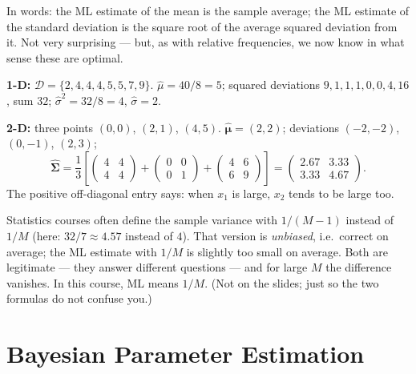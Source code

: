 \documentclass[11pt, oneside]{book}
\newcommand{\dataset}{\mathcal{D}}       %
\let\originalsection\section
\renewcommand{\section}{\Needspace{7\baselineskip}\originalsection}
\begin{document}
In words: the ML estimate of the mean is the sample average; the ML estimate
of the standard deviation is the square root of the average squared deviation
from it. Not very surprising --- but, as with relative frequencies, we now know
in what sense these are optimal.

\begin{exbox}[title={Two small Gaussian fits}]
\textbf{1-D:} $\dataset = \{2, 4, 4, 4, 5, 5, 7, 9\}$.
$\hat\mu = 40/8 = 5$; squared deviations $9, 1, 1, 1, 0, 0, 4, 16$, sum $32$;
$\hat\sigma^2 = 32/8 = 4$, $\hat\sigma = 2$.\par\smallskip
\textbf{2-D:} three points $(0,0)$, $(2,1)$, $(4,5)$.
$\hat{\bm\mu} = (2, 2)$; deviations $(-2,-2)$, $(0,-1)$, $(2,3)$;
\[
\hat{\bm\Sigma} = \frac{1}{3}\left[
\begin{pmatrix} 4 & 4 \\ 4 & 4 \end{pmatrix} +
\begin{pmatrix} 0 & 0 \\ 0 & 1 \end{pmatrix} +
\begin{pmatrix} 4 & 6 \\ 6 & 9 \end{pmatrix}\right]
= \begin{pmatrix} 2.67 & 3.33 \\ 3.33 & 4.67 \end{pmatrix}.
\]
The positive off-diagonal entry says: when $x_1$ is large, $x_2$ tends to be
large too.
\end{exbox}

\begin{notebox}[title={$1/M$ or $1/(M-1)$?}]
Statistics courses often define the sample variance with $1/(M-1)$ instead of
$1/M$ (here: $32/7 \approx 4.57$ instead of $4$). That version is
\emph{unbiased}, i.e.\ correct on average; the ML estimate with $1/M$ is
slightly too small on average. Both are legitimate --- they answer different
questions --- and for large $M$ the difference vanishes. In this course, ML
means $1/M$. (Not on the slides; just so the two formulas do not confuse you.)
\end{notebox}

\section{Bayesian Parameter Estimation}
\label{sec:bayes-estimation}
\end{document}
